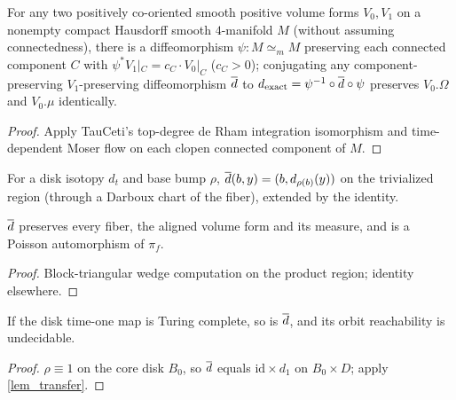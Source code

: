 \begin{theorem}
\label{thm_moser_volume}
\leanok
{}
For any two positively co-oriented smooth positive volume forms $V_0,V_1$ on a nonempty compact
Hausdorff smooth $4$-manifold $M$ (without assuming connectedness), there is a diffeomorphism
$\psi\colon M\simeq_m M$ preserving each connected component $C$ with $\psi^*V_1|_C = c_C\cdot V_0|_C$
($c_C>0$); conjugating any component-preserving $V_1$-preserving diffeomorphism $\overline{d}$ to
$d_{\mathrm{exact}}=\psi^{-1}\circ\overline{d}\circ\psi$ preserves $V_0.\Omega$ and $V_0.\mu$ identically.
\end{theorem}
\begin{proof}\leanok
Apply TauCeti's top-degree de Rham integration isomorphism and time-dependent Moser flow on each
clopen connected component of $M$.
\end{proof}

\begin{definition}
\label{def_leafwise}
\leanok
{}
For a disk isotopy $d_t$ and base bump $\rho$, $\overline{d}(b,y)=(b,d_{\rho(b)}(y))$ on the trivialized
region (through a Darboux chart of the fiber), extended by the identity.
\end{definition}

\begin{theorem}
\label{thm_leafwise_props}
\leanok
{}
$\overline{d}$ preserves every fiber, the aligned volume form and its measure, and is a Poisson
automorphism of $\pi_f$.
\end{theorem}
\begin{proof}\leanok
Block-triangular wedge computation on the product region; identity elsewhere.
\end{proof}

\begin{theorem}
\label{thm_lift_tc}
\leanok
{}
If the disk time-one map is Turing complete, so is $\overline{d}$, and its orbit reachability is
undecidable.
\end{theorem}
\begin{proof}\leanok
$\rho\equiv1$ on the core disk $B_0$, so $\overline{d}$ equals $\mathrm{id}\times d_1$ on $B_0\times D$;
apply \cref{lem_transfer}.
\end{proof}

